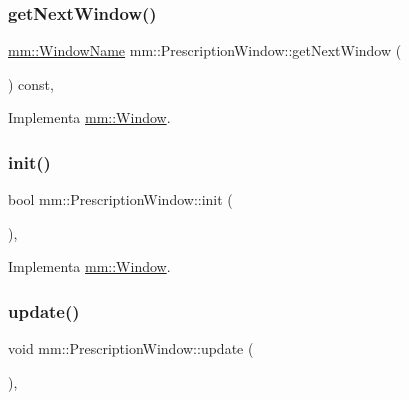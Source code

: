 \subsubsection{\texorpdfstring{get\+Next\+Window()}{getNextWindow()}}
{\footnotesize\ttfamily \mbox{\hyperlink{namespacemm_a4e9d92e04f65dbf2fc1963947da0d93c}{mm\+::\+Window\+Name}} mm\+::\+Prescription\+Window\+::get\+Next\+Window (\begin{DoxyParamCaption}{ }\end{DoxyParamCaption}) const\hspace{0.3cm}{\ttfamily [override]}, {\ttfamily [virtual]}}



Implementa \mbox{\hyperlink{classmm_1_1_window_a0cd7b4b0feb9505c44503547a161fcd8}{mm\+::\+Window}}.

\mbox{\label{classmm_1_1_prescription_window_a4764fe59cd6aeaa46c7fd8820dd4102b}} 
\subsubsection{\texorpdfstring{init()}{init()}}
{\footnotesize\ttfamily bool mm\+::\+Prescription\+Window\+::init (\begin{DoxyParamCaption}{ }\end{DoxyParamCaption})\hspace{0.3cm}{\ttfamily [override]}, {\ttfamily [virtual]}}



Implementa \mbox{\hyperlink{classmm_1_1_window_aba03fbf4761b2f106352baecf5996e10}{mm\+::\+Window}}.

\mbox{\label{classmm_1_1_prescription_window_a51195815f64b79179e3dafbb89b785e8}} 
\subsubsection{\texorpdfstring{update()}{update()}}
{\footnotesize\ttfamily void mm\+::\+Prescription\+Window\+::update (\begin{DoxyParamCaption}{ }\end{DoxyParamCaption})\hspace{0.3cm}{\ttfamily [override]}, {\ttfamily [virtual]}}



